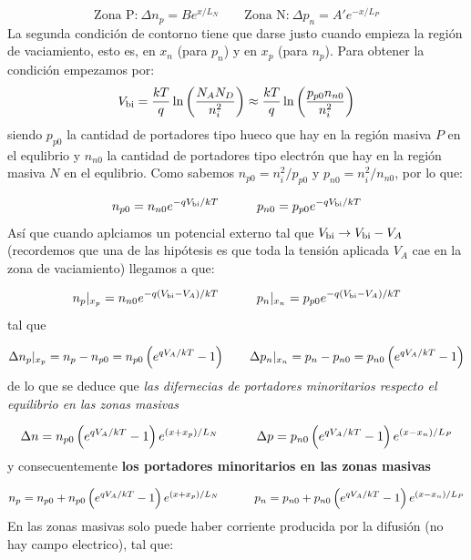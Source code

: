\begin{equation}
    \text{Zona P:} \
    \Delta n_p = B e^{x/L_N} \qquad 
    \text{Zona N:}  \
    \Delta p_n = A' e^{-x/L_P} 
\end{equation}
La segunda condición de contorno tiene que darse justo cuando empieza la región de vaciamiento, esto es, en $x_n$ (para $p_n$) y en $x_p$ (para $n_p$). Para obtener la condición empezamos por:
\begin{equation}
    V_{\text{bi}} = \frac{kT}{q} \ln  \left( \frac{N_AN_D}{n_i^2} \right) \approx  \frac{kT}{q} \ln  \left( \frac{p_{p0}n_{n0}}{n_i^2} \right)
\end{equation}
siendo $p_{p0}$ la cantidad de portadores tipo hueco que hay en la región masiva $P$ en el equlibrio y $n_{n0}$ la cantidad de portadores tipo electrón que hay en la región masiva $N$ en el equlibrio. Como sabemos $n_{p0}=n_i^2/p_{p0}$ y $p_{n0}=n_i^2/n_{n0}$, por lo que:

\begin{equation}
    n_{p0} = n_{n0} e^{-qV_{\text{bi}} /kT}  \quad \quad \quad
    p_{n0} = p_{p0} e^{-qV_{\text{bi}} /kT}
\end{equation}
Así que cuando aplciamos un potencial externo tal que $V_{\text{bi}}\rightarrow V_{\text{bi}}- V_A$ (recordemos que una de las hipótesis es que toda la tensión aplicada $V_A$ cae en la zona de vaciamiento) llegamos a que:

\begin{equation}
    n_{p} |_{x_p}= n_{n0} e^{-q(V_{\text{bi}}-V_A) /kT}  \quad \quad \quad
    p_{n} |_{x_n}= p_{p0} e^{-q(V_{\text{bi}}-V_A)/kT}
\end{equation}
tal que 

\begin{equation}
    \Delta n_p |_{x_p} = n_{p}-n_{p0} = n_{p0} \left(  e^{qV_A/kT}  -1 \right) \qquad 
    \Delta p_n |_{x_n} = p_{n}-p_{n0} = p_{n0} \left(  e^{qV_A/kT}  -1 \right)
\end{equation}
de lo que se deduce que \textit{las difernecias de portadores minoritarios respecto el equilibrio en las zonas masivas}

\begin{equation}
    \Delta n = n_{p0} \left( e^{qV_A/kT}-1 \right) e^{(x+x_p)/L_N} \quad \quad \quad 
    \Delta p = p_{n0} \left( e^{qV_A/kT}-1 \right) e^{(x-x_n)/L_P}
\end{equation}
y consecuentemente \textbf{los portadores minoritarios en las zonas masivas}

\begin{equation}
     n_p = n_{p0} + n_{p0} \left( e^{qV_A/kT}-1 \right) e^{(x+x_p)/L_N} \quad \quad \quad 
     p_n = p_{n0} + p_{n0} \left( e^{qV_A/kT}-1 \right) e^{(x-x_n)/L_P}
\end{equation}
En las zonas masivas solo puede haber corriente producida por la difusión (no hay campo electrico), tal que:

